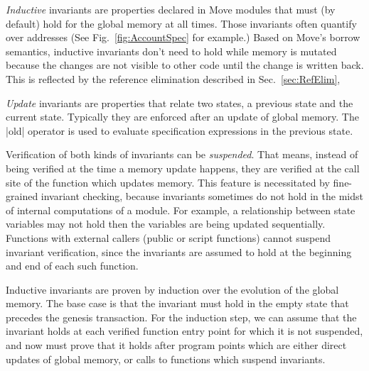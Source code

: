 

\emph{Inductive} invariants are properties declared in Move modules that must
(by default) hold for the global memory at all times. Those invariants often
quantify over addresses (See Fig.~\ref{fig:AccountSpec} for example.) Based on
Move's borrow semantics, inductive invariants don't need to hold while memory is
mutated because the changes are not visible to other code until the change is written back.
This is reflected by the reference elimination described in
Sec.~\ref{sec:RefElim},

\emph{Update} invariants are properties that relate two states,
a previous state and the current state.
Typically they
are enforced after an update of global memory. The |old| operator
is used to evaluate specification expressions in the previous state.

Verification of both kinds of invariants can be \emph{suspended}. That means,
instead of being verified at the time a memory update happens, they are verified
at the call site of the function which updates memory. This feature is necessitated
by fine-grained invariant checking, because invariants sometimes do not hold
in the midst of internal computations of a module. For example, a relationship
between state variables may not hold then the variables are being updated sequentially.
Functions with external callers (public or script
functions) cannot suspend invariant verification,
since the invariants are assumed to hold at the beginning and end of each such function.


Inductive invariants are proven by induction over the evolution of the global
memory. The base case is that the invariant must hold in the empty state that
precedes the genesis transaction.  For the induction step, we can assume that
the invariant holds at each verified function entry point for which it is not
suspended, and now must prove that it holds after program points which are
either direct updates of global memory, or calls to functions which suspend
invariants.

